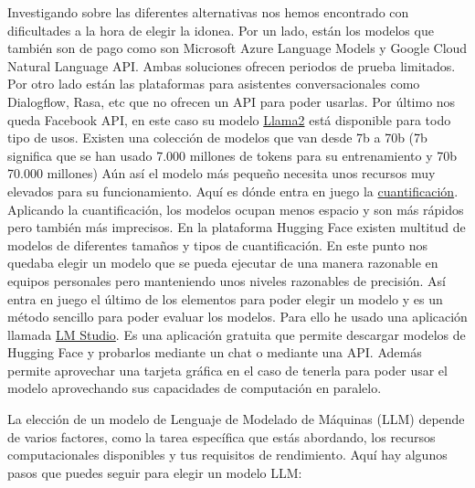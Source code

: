 Investigando sobre las diferentes alternativas nos hemos encontrado con dificultades a la hora de elegir la idonea.
Por un lado, están los modelos que también son de pago como son Microsoft Azure Language Models y Google Cloud Natural Language API. Ambas soluciones ofrecen periodos de prueba limitados.
Por otro lado están las plataformas para asistentes conversacionales como Dialogflow, Rasa, etc que no ofrecen un API para poder usarlas.
Por último nos queda Facebook API, en este caso su modelo \href{https://github.com/facebookresearch/llama}{Llama2} está disponible para todo tipo de usos.
Existen una colección de modelos que van desde 7b a 70b (7b significa que se han usado 7.000 millones de tokens para su entrenamiento y 70b 70.000 millones)
Aún así el modelo más pequeño necesita unos recursos muy elevados para su funcionamiento. Aquí es dónde entra en juego la \href{https://es.wikipedia.org/wiki/Cuantificaci%C3%B3n_digital}{cuantificación}.
Aplicando la cuantificación, los modelos ocupan menos espacio y son más rápidos pero también más imprecisos.
En la plataforma Hugging Face existen multitud de modelos de diferentes tamaños y tipos de cuantificación.
En este punto nos quedaba elegir un modelo que se pueda ejecutar de una manera razonable en equipos personales pero manteniendo unos niveles razonables de precisión.
Así entra en juego el último de los elementos para poder elegir un modelo y es un método sencillo para poder evaluar los modelos.
Para ello he usado una aplicación llamada \href{https://lmstudio.ai/}{LM Studio}. Es una aplicación gratuita que permite descargar modelos de Hugging Face y probarlos mediante un chat o mediante una API.
Además permite aprovechar una tarjeta gráfica en el caso de tenerla para poder usar el modelo aprovechando sus capacidades de computación en paralelo.

La elección de un modelo de Lenguaje de Modelado de Máquinas (LLM) depende de varios factores, como la tarea específica que estás abordando, los recursos computacionales disponibles y tus requisitos de rendimiento. Aquí hay algunos pasos que puedes seguir para elegir un modelo LLM:
